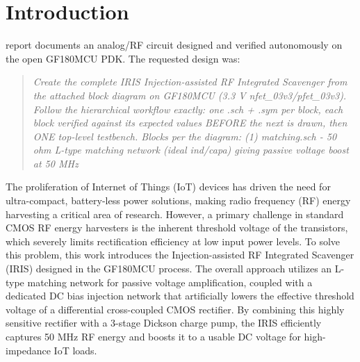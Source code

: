 \documentclass{ieeeaccess}
\begin{document}
\section{Introduction}
 report documents an analog/RF circuit designed and verified autonomously on the open GF180MCU PDK. The requested design was:
\begin{quote}\itshape Create the complete IRIS Injection-assisted RF Integrated Scavenger from the attached block diagram on GF180MCU (3.3 V nfet\_03v3/pfet\_03v3). Follow the hierarchical workflow exactly: one .sch + .sym per block, each block verified against its expected values BEFORE the next is drawn, then ONE top-level testbench. Blocks per the diagram: (1) matching.sch - 50 ohm L-type matching network (ideal ind/capa) giving passive voltage boost at 50 MHz\end{quote}
The proliferation of Internet of Things (IoT) devices has driven the need for ultra-compact, battery-less power solutions, making radio frequency (RF) energy harvesting a critical area of research. However, a primary challenge in standard CMOS RF energy harvesters is the inherent threshold voltage of the transistors, which severely limits rectification efficiency at low input power levels. To solve this problem, this work introduces the Injection-assisted RF Integrated Scavenger (IRIS) designed in the GF180MCU process. The overall approach utilizes an L-type matching network for passive voltage amplification, coupled with a dedicated DC bias injection network that artificially lowers the effective threshold voltage of a differential cross-coupled CMOS rectifier. By combining this highly sensitive rectifier with a 3-stage Dickson charge pump, the IRIS efficiently captures 50 MHz RF energy and boosts it to a usable DC voltage for high-impedance IoT loads.
\end{document}
